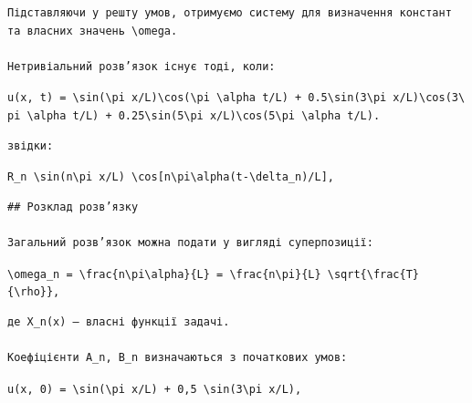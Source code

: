 \documentclass[
  ukrainian,
]{article}
\begin{document}
\begin{verbatim}
Підставляючи у решту умов, отримуємо систему для визначення констант та власних значень \omega.

Нетривіальний розв’язок існує тоді, коли:
\end{verbatim}

\texttt{u(x,\ t)\ =\ \textbackslash{}sin(\textbackslash{}pi\ x/L)\textbackslash{}cos(\textbackslash{}pi\ \textbackslash{}alpha\ t/L)\ +\ 0.5\textbackslash{}sin(3\textbackslash{}pi\ x/L)\textbackslash{}cos(3\textbackslash{}pi\ \textbackslash{}alpha\ t/L)\ +\ 0.25\textbackslash{}sin(5\textbackslash{}pi\ x/L)\textbackslash{}cos(5\textbackslash{}pi\ \textbackslash{}alpha\ t/L).}

\begin{verbatim}
звідки:
\end{verbatim}

\texttt{R\_n\ \textbackslash{}sin(n\textbackslash{}pi\ x/L)\ \textbackslash{}cos{[}n\textbackslash{}pi\textbackslash{}alpha(t-\textbackslash{}delta\_n)/L{]},}

\begin{verbatim}
## Розклад розв’язку

Загальний розв’язок можна подати у вигляді суперпозиції:
\end{verbatim}

\texttt{\textbackslash{}omega\_n\ =\ \textbackslash{}frac\{n\textbackslash{}pi\textbackslash{}alpha\}\{L\}\ =\ \textbackslash{}frac\{n\textbackslash{}pi\}\{L\}\ \textbackslash{}sqrt\{\textbackslash{}frac\{T\}\{\textbackslash{}rho\}\},}

\begin{verbatim}
де X_n(x) — власні функції задачі.

Коефіцієнти A_n, B_n визначаються з початкових умов:
\end{verbatim}

\texttt{u(x,\ 0)\ =\ \textbackslash{}sin(\textbackslash{}pi\ x/L)\ +\ 0,5\ \textbackslash{}sin(3\textbackslash{}pi\ x/L),}
\end{document}
